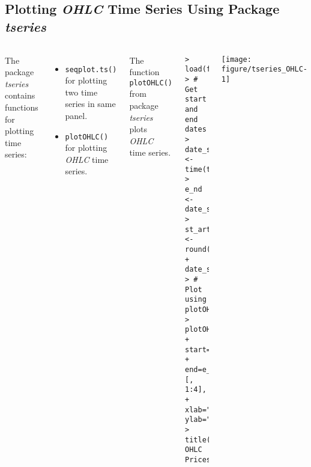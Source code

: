 \documentclass[10pt]{beamer}\usepackage[]{graphicx}\usepackage[]{color}
\makeatletter
\newenvironment{kframe}{%
 \def\at@end@of@kframe{}%
 \ifinner\ifhmode%
  \def\at@end@of@kframe{\end{minipage}}%
  \begin{minipage}{\columnwidth}%
 \fi\fi%
 \def\FrameCommand##1{\hskip\@totalleftmargin \hskip-\fboxsep
 \colorbox{shadecolor}{##1}\hskip-\fboxsep
     \hskip-\linewidth \hskip-\@totalleftmargin \hskip\columnwidth}%
 \MakeFramed {\advance\hsize-\width
   \@totalleftmargin\z@ \linewidth\hsize
   \@setminipage}}%
 {\par\unskip\endMakeFramed%
 \at@end@of@kframe}
\newenvironment{knitrout}{}{} %
\makeatother
\begin{document}
\subsection{Plotting \protect\emph{OHLC} Time Series Using Package \protect\emph{tseries}}
\begin{frame}[fragile,t]{\subsecname}
\vspace{-1em}
\begin{block}{}
  \begin{columns}[T]
      The package \emph{tseries} contains functions for plotting time series:
      \begin{itemize}
        \item \texttt{seqplot.ts()} for plotting two time series in same panel.
        \item \texttt{plotOHLC()} for plotting \emph{OHLC} time series.
      \end{itemize}
      The function \texttt{plotOHLC()} from package \emph{tseries} plots \emph{OHLC} time series.
\begin{knitrout}\tiny
{}\color{fgcolor}\begin{kframe}
\begin{verbatim}
> load(file="C:/Develop/lecture_slides/data/zoo_data.RData")
> # Get start and end dates
> date_s <- time(ts_stx_adj)
> e_nd <- date_s[NROW(date_s)]
> st_art <- round((4*e_nd + date_s[1])/5)
> # Plot using plotOHLC
> plotOHLC(window(ts_stx_adj,
+           start=st_art,
+           end=e_nd)[, 1:4],
+    xlab="", ylab="")
> title(main="MSFT OHLC Prices")
\end{verbatim}
\end{kframe}
\end{knitrout}
      \texttt{[image: figure/tseries\_OHLC-1]}
  \end{columns}
\end{block}

\end{frame}


\end{document}
